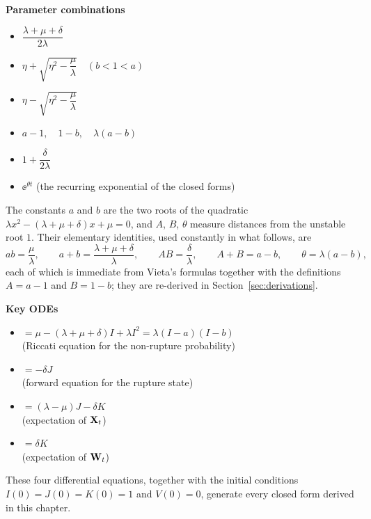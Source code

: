 \noindent
\textbf{Parameter combinations}
\begin{itemize}[leftmargin=\indentA]
\item[$\eta$ =]$\dfrac{\lambda+\mu+\delta}{2\lambda}$
\item[$a$ =]$\eta+\sqrt{\eta^2-\dfrac{\mu}{\lambda}}\quad(b<1<a)$
\item[$b$ =]$\eta-\sqrt{\eta^2-\dfrac{\mu}{\lambda}}$
\item[$A,B,\theta$ =]$a-1,\quad 1-b,\quad \lambda(a-b)$
\item[$\kappa$ =]$1+\dfrac{\delta}{2\lambda}$
\item[$w$ =]$\ee^{\theta t}$ (the recurring exponential of the closed forms)
\end{itemize}

\noindent
The constants $a$ and $b$ are the two roots of the quadratic
$\lambda x^2-(\lambda+\mu+\delta)x+\mu=0$, and $A$, $B$, $\theta$ measure
distances from the unstable root $1$. Their elementary identities, used
constantly in what follows, are
\begin{equation}
\label{eq:identities}
ab=\frac{\mu}{\lambda},\qquad a+b=\frac{\lambda+\mu+\delta}{\lambda},\qquad
AB=\frac{\delta}{\lambda},\qquad A+B=a-b,\qquad \theta=\lambda(a-b),
\end{equation}
each of which is immediate from Vieta's formulas together with the definitions
$A=a-1$ and $B=1-b$; they are re-derived in Section~\ref{sec:derivations}.

\noindent
\textbf{Key ODEs}
\begin{itemize}[leftmargin=\indentA]
\item[$\ddt{I}$]$ = \mu - (\lambda + \mu + \delta) I + \lambda I^2 = \lambda(I-a)(I-b)$ \\(Riccati equation for the non-rupture probability)
\item[$\ddt{I}$]$= -\delta J$ \\(forward equation for the rupture state)
\item[$\ddt{J} $]$= (\lambda - \mu)J - \delta K$ \\(expectation of ${{\bf X}_t}$)
\item[$\ddt{V}$]$= \delta K $ \\(expectation of ${{\bf W}_t}$)
\end{itemize}

\noindent
These four differential equations, together with the initial conditions
$I(0)=J(0)=K(0)=1$ and $V(0)=0$, generate every closed form derived in this
chapter.
